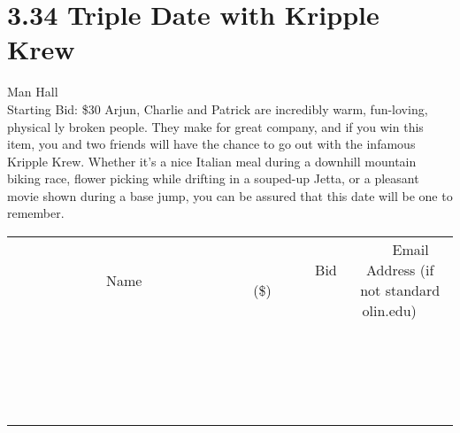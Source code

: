 \documentclass[11pt]{article}
\begin{document}
\section*{3.34 Triple Date with Kripple Krew}
Man Hall
\\
Starting Bid: \$30
\newline
Arjun, Charlie and Patrick are incredibly warm, fun-loving, physical ly broken people. They make for great company, and if you win this item, you and two friends will have the chance to go out with the infamous Kripple Krew. Whether it's a nice Italian meal during a downhill mountain biking race, flower picking while drifting in a souped-up Jetta, or a pleasant movie shown during a base jump, you can be assured that this date will be one to remember.
\\[3ex]
\begin{tabular}{c c c}
~~~~~~~~~~~~~Name~~~~~~~~~~~~~ & ~~~~~~~~~Bid (\$)~~~~~~~~~  & ~~~Email Address (if not standard olin.edu)~~~\\
 & & \\
\hline
 & & \\
\hline
 & & \\
\hline
 & & \\
\hline
 & & \\
\hline
 & & \\
\hline
 & & \\
\hline
 & & \\
\hline
 & & \\
\hline
 & & \\
\hline
 & & \\
\hline
 & & \\
\hline
 & & \\
\hline
 & & \\
\hline
 & & \\
\hline
 & & \\
\hline
 & & \\
\hline
 & & \\
\hline
 & & \\
\hline
\end{tabular}
\newpage
\end{document}
